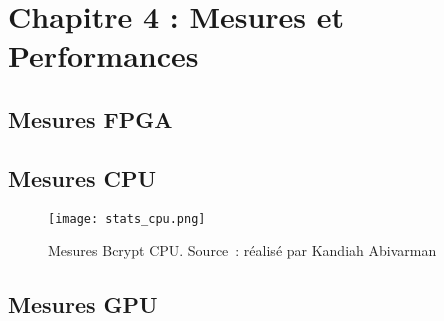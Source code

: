 \chapter{Chapitre 4 : Mesures et Performances}


\section{Mesures FPGA}

\section{Mesures CPU}

\begin{figure}[tbph!]
	\centering
	\texttt{[image: stats\_cpu.png]}
	\caption[Mesures Bcrypt CPU]{Mesures Bcrypt CPU. Source : réalisé par Kandiah Abivarman}
	\label{fig:cpu_measures}
\end{figure}

\section{Mesures GPU}

